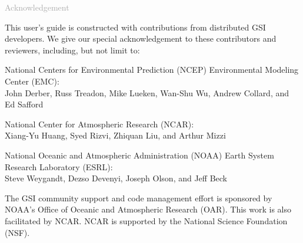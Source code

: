 \begin{titlepage}
\vspace*{0.5cm}
\noindent

\begin{flushleft}
\textcolor{darkgray}{\LARGE Acknowledgement}
\vspace*{1cm}\par

This user's guide is constructed with contributions from distributed GSI developers. We give our special acknowledgement to these contributors and reviewers, including, but not limit to:

National Centers for Environmental Prediction (NCEP) Environmental Modeling Center (EMC): \\
John Derber, Russ Treadon, Mike Lueken, Wan-Shu Wu, Andrew Collard, and Ed Safford 

National Center for Atmospheric Research (NCAR): \\
Xiang-Yu Huang, Syed Rizvi, Zhiquan Liu, and Arthur Mizzi  

National Oceanic and Atmospheric Administration (NOAA) Earth System Research Laboratory (ESRL): \\
Steve Weygandt, Dezso Devenyi, Joseph Olson, and Jeff Beck

The GSI community support and code management effort is sponsored by NOAA's Office of Oceanic and Atmospheric Research (OAR). This work is also facilitated by NCAR. NCAR is supported by the National Science Foundation (NSF).

\end{flushleft}
\end{titlepage}
\pagebreak{}




